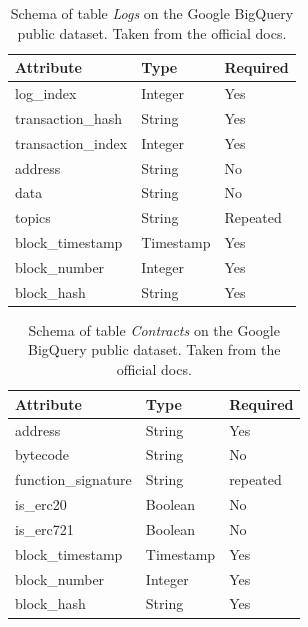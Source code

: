\begin{table}[H]
\centering
    \begin{tabular}  { m{6cm} m{3cm} m{3cm} } 
    \toprule
    \textbf{Attribute} & \textbf{Type} & \textbf{Required} \\
    \midrule
    log\_index & Integer	& Yes \\
    transaction\_hash & String & Yes \\
    transaction\_index & Integer & Yes	\\		
    address & String & No \\
    data & String & No \\
    topics & String & Repeated \\
    block\_timestamp & Timestamp & Yes \\ 
    block\_number & Integer & Yes \\
    block\_hash & String & Yes \\
    \bottomrule
\end{tabular}
\caption[Google BigQuery \texttt{Logs} table]{Schema of table \textit{Logs} on the Google BigQuery public dataset. Taken from the official docs.}
\label{table:bigquery-logs}
\end{table}

\begin{table}[H]
\centering
    \begin{tabular}  { m{6cm} m{3cm} m{3cm} } 
    \toprule
    \textbf{Attribute} & \textbf{Type} & \textbf{Required} \\
    \midrule
    address & String & Yes \\
    bytecode & String & No \\
    function\_signature & String & repeated \\
    is\_erc20 & Boolean & No \\
    is\_erc721 & Boolean & No \\
    block\_timestamp & Timestamp & Yes \\
    block\_number & Integer & Yes \\
    block\_hash & String & Yes \\
    \bottomrule
\end{tabular}
\caption[Google BigQuery \texttt{Contracts} table]{Schema of table \textit{Contracts} on the Google BigQuery public dataset. Taken from the official docs.}
\label{table:bigquery-contracts}
\end{table}

